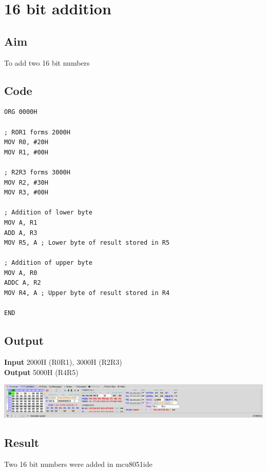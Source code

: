 \section{16 bit addition}
\subsection{Aim}
To add two 16 bit numbers

\subsection{Code}
\begin{lstlisting}
ORG 0000H

; ROR1 forms 2000H
MOV R0, #20H
MOV R1, #00H

; R2R3 forms 3000H
MOV R2, #30H
MOV R3, #00H

; Addition of lower byte
MOV A, R1
ADD A, R3
MOV R5, A ; Lower byte of result stored in R5

; Addition of upper byte
MOV A, R0
ADDC A, R2
MOV R4, A ; Upper byte of result stored in R4

END
\end{lstlisting}

\subsection{Output}
\textbf{Input} 2000H (R0R1), 3000H (R2R3)\\
\textbf{Output} 5000H (R4R5)
\begin{center}
	\includegraphics[width=\textwidth]{img/p21.png}
\end{center}

\subsection{Result}
Two 16 bit numbers were added in mcu8051ide

